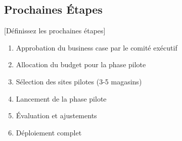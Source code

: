 
\subsection{Prochaines Étapes}
[Définissez les prochaines étapes]

\begin{enumerate}
\item Approbation du business case par le comité exécutif
\item Allocation du budget pour la phase pilote
\item Sélection des sites pilotes (3-5 magasins)
\item Lancement de la phase pilote
\item Évaluation et ajustements
\item Déploiement complet
\end{enumerate}



